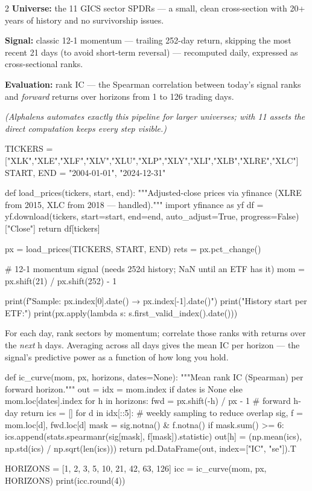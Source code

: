 \documentclass{pyportfolios-note}
\begin{document}
\begin{multicols}{2}
\textbf{Universe:} the 11 GICS sector SPDRs — a small, clean cross-section with
20+ years of history and no survivorship issues.

\textbf{Signal:} classic 12-1 momentum — trailing 252-day return, skipping the
most recent 21 days (to avoid short-term reversal) — recomputed daily,
expressed as cross-sectional ranks.

\textbf{Evaluation:} rank IC — the Spearman correlation between today's signal
ranks and \textit{forward} returns over horizons from 1 to 126 trading days.

\textit{(Alphalens automates exactly this pipeline for larger universes; with 11
assets the direct computation keeps every step visible.)}
\end{multicols}

\begin{notecode}
TICKERS = ["XLK","XLE","XLF","XLV","XLU","XLP","XLY","XLI","XLB","XLRE","XLC"]
START, END = "2004-01-01", "2024-12-31"

def load_prices(tickers, start, end):
    """Adjusted-close prices via yfinance (XLRE from 2015, XLC from 2018 — handled)."""
    import yfinance as yf
    df = yf.download(tickers, start=start, end=end, auto_adjust=True, progress=False)["Close"]
    return df[tickers]

px = load_prices(TICKERS, START, END)
rets = px.pct_change()

# 12-1 momentum signal (needs 252d history; NaN until an ETF has it)
mom = px.shift(21) / px.shift(252) - 1

print(f"Sample: {px.index[0].date()} → {px.index[-1].date()}")
print("History start per ETF:")
print(px.apply(lambda s: s.first_valid_index().date()))
\end{notecode}

\noteneedroom{150bp}

For each day, rank sectors by momentum; correlate those ranks with returns over
the \textit{next} h days. Averaging across all days gives the mean IC per
horizon — the signal's predictive power as a function of how long you hold.

\begin{notecode}
def ic_curve(mom, px, horizons, dates=None):
    """Mean rank IC (Spearman) per forward horizon."""
    out = {}
    idx = mom.index if dates is None else mom.loc[dates].index
    for h in horizons:
        fwd = px.shift(-h) / px - 1                     # forward h-day return
        ics = []
        for d in idx[::5]:                              # weekly sampling to reduce overlap
            sig, f = mom.loc[d], fwd.loc[d]
            mask = sig.notna() & f.notna()
            if mask.sum() >= 6:
                ics.append(stats.spearmanr(sig[mask], f[mask]).statistic)
        out[h] = (np.mean(ics), np.std(ics) / np.sqrt(len(ics)))
    return pd.DataFrame(out, index=["IC", "se"]).T

HORIZONS = [1, 2, 3, 5, 10, 21, 42, 63, 126]
icc = ic_curve(mom, px, HORIZONS)
print(icc.round(4))
\end{notecode}
\end{document}
